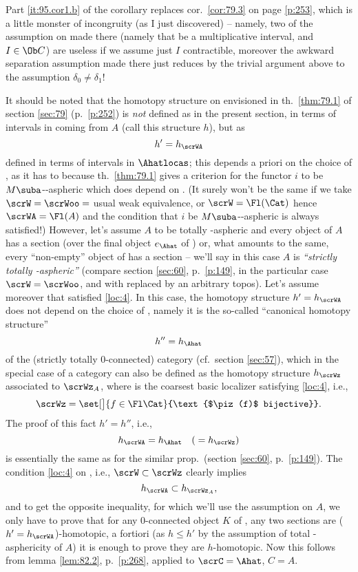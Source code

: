 \begin{remarks}
  \enspace Part \ref{it:95.cor1.b} of the
  corollary replaces cor.\ \ref{cor:79.3} on page \ref{p:253}, which
  is a little monster of incongruity (as I just discovered) -- namely,
  two of the assumption on \bI{} made there (namely that \bI{} be a
  multiplicative interval, and $I\in\Ob C$) are useless if we assume
  just $I$ contractible, moreover the awkward separation assumption
  made there just reduces by the trivial argument above to the
  assumption $\delta_0\ne\delta_1$!

  \enspace It should be noted that the
  homotopy structure on \Ahat{} envisioned in th.\ \ref{thm:79.1} of
  section \ref{sec:79} (p.\ \ref{p:252}) is \emph{not} defined as in
  the present section, in terms of intervals in \Ahat{} coming from
  $A$ (call this structure $h$), but as
  \[ h' = h_\scrWA\]
  defined in terms of intervals in $\Ahatlocas$; this depends a priori
  on the choice of \scrW, as it has to because th.\ \ref{thm:79.1}
  gives a criterion for the functor $i$ to be $M\suba$-\scrW-aspheric
  which does depend on \scrW. (It surely won't be the same if we take
  $\scrW=\scrWoo=$ usual weak equivalence, or $\scrW=\Fl(\Cat)$ hence
  $\scrWA=\Fl(A)$ and the condition that $i$ be
  $M\suba$-\scrW-aspheric is always satisfied!) However, let's assume
  $A$ to be totally \scrW-aspheric and every object of $A$ has a
  section (over the final object $e_\Ahat$ of \Ahat) or, what amounts
  to the same, every ``non-empty'' object of \Ahat{} has a section --
  we'll say in this case $A$ is \emph{``strictly totally
    \scrW-aspheric''} (compare section \ref{sec:60}, p.\ \ref{p:149},
  in the particular case $\scrW=\scrWoo$, and with \Ahat{} replaced by
  an arbitrary topos). Let's assume moreover that \scrW{} satisfied
  \ref{loc:4}. In this case, the homotopy structure $h'=h_\scrWA$ does
  not depend on the choice of \scrW, namely it is the so-called
  ``canonical homotopy structure''
  \[h'' = h_\Ahat\]
  of the (strictly totally $0$-connected) category \Ahat{} (cf.\
  section \ref{sec:57}), which in the special case of a category
  \Ahat{} can also be defined as the homotopy structure $h_\scrWz$
  associated to ${\scrWz}_A$, where \scrWz{} is the coarsest basic
  localizer satisfying \ref{loc:4}, i.e.,
  \[\scrWz=\set[\big]{f\in\Fl\Cat}{\text{$\piz(f)$ bijective}}.\]
  The proof of this fact $h'=h''$, i.e.,
  \[h_\scrWA = h_\Ahat \quad ({}=h_{\scrWz})\]
  is essentially the same as for the similar prop.\ (section
  \ref{sec:60}, p.\ \ref{p:149}). The condition \ref{loc:4} on \scrW,
  i.e., $\scrW\subset\scrWz$ clearly implies
  \[h_\scrWA\subset h_{{\scrWz}_A},\]
  and to get the opposite inequality, for which we'll use the
  assumption on $A$, we only have to prove that for any $0$-connected
  object $K$ of \Ahat, any two sections are ($h'=h_\scrWA$)-homotopic,
  a fortiori (as $h\le h'$ by the assumption of total
  \scrW-asphericity of $A$) it is enough to prove they are
  $h$-homotopic. Now this follows from lemma \ref{lem:82.2}, p.\
  \ref{p:268}, applied to $\scrC=\Ahat$, $C=A$.
\end{remarks}

